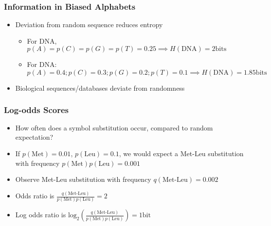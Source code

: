 \begin{frame}
  \frametitle{Information in Biased Alphabets}
  \begin{itemize}
    \item Deviation from random sequence reduces entropy
    \begin{itemize}
      \item For DNA, $p(A) = p(C) = p(G) = p(T) = 0.25 \implies H(\text{DNA}) = 2\text{bits}$       
      \item For DNA: $p(A) = 0.4; p(C) = 0.3; p(G) = 0.2; p(T) = 0.1 \implies H(\text{DNA}) = 1.85\text{bits}$       
    \end{itemize}
    \item Biological sequences/databases deviate from randomness
  \end{itemize}
\end{frame}
  
\begin{frame}
  \frametitle{Log-odds Scores}
  \begin{itemize}
    \item<1-> How often does a symbol substitution occur, compared to random expectation?
    \item<1-> If $p(\text{Met}) = 0.01$, $p(\text{Leu}) = 0.1$, we would expect a Met-Leu substitution with frequency $p(\text{Met})p(\text{Leu}) = 0.001$
    \item<2-> Observe Met-Leu substitution with frequency $q(\text{Met-Leu}) = 0.002$
    \item<2-> Odds ratio is $\frac{q(\text{Met-Leu})}{p(\text{Met})p(\text{Leu})} = 2$
    \item<3-> Log odds ratio is $\text{log}_2(\frac{q(\text{Met-Leu})}{p(\text{Met})p(\text{Leu})}) = 1\text{bit}$
  \end{itemize}
\end{frame}  